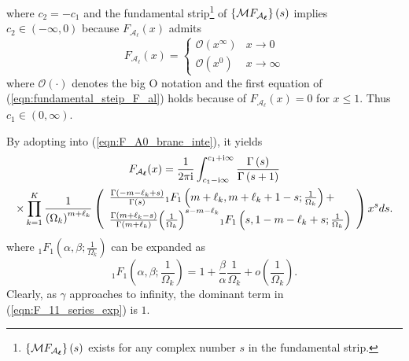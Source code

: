\documentclass[12pt,onecolumn,draftcls]{IEEEtran}
\newcommand{\bs}{\boldsymbol}
\begin{document}
where
$c_2 = -c_1$ and the fundamental strip\footnote{$ \left\{ {\mathcal M{{F_{{{ {\cal A}}_{\bs{\ell}}}}}}} \right\}\left( s \right)$ exists for any complex number $s$ in the fundamental strip.} of $ \left\{ {\mathcal M{{F_{{{ {\cal A}}_{\bs{\ell}}}}}}} \right\}\left( s \right)$ implies $c_2 \in (-\infty,0)$ because $ {F_{{\mathcal A_{\bs \ell} }}}\left( x \right)$ admits\cite[p400]{szpankowski2010average}
 \begin{equation}\label{eqn:fundamental_steip_F_al}
 {F_{{\mathcal A_{\bs \ell} }}}\left( x \right) = \left\{ {\begin{array}{*{20}{c}}
{\mathcal O\left( {{x^\infty }} \right)}&{x \to 0}\\
{\mathcal O\left( {{x^0}} \right)}&{x \to \infty }
\end{array}} \right.
 \end{equation}
 where $\mathcal O(\cdot)$ denotes the big O notation and the first equation of (\ref{eqn:fundamental_steip_F_al}) holds because of ${F_{{\mathcal A_{\bs \ell} }}}\left( x \right) = 0$ for $x \le 1$. Thus $c_1 \in (0,\infty)$.


By adopting \cite[Eq.9.210.2]{gradshteyn1965table} into (\ref{eqn:F_A0_brane_inte}), it yields
\begin{multline}\label{eqn:F_hat_A_0_der_fur_ex}
{F_{{{ {\cal A}}_{\bs{\ell}}}}}(x) = \frac{1}{{2\pi {\rm{i}}}}\int\nolimits_{c_1 - {\rm{i}}\infty }^{c_1 + {\rm{i}}\infty } {\frac{{\Gamma \left( s \right)}}{{\Gamma \left( {s + 1} \right)}} } \\
\times \prod\limits_{k = 1}^K {\frac{1}{{{{\left( {{\Omega _k}} \right)}^{m+\ell_k }}}}}\left( {\begin{array}{*{20}{l}}
{\frac{{\Gamma \left( { - m -\ell_k+ s} \right)}}{{\Gamma \left( s \right)}}{}_1{F_1}\left( {m+\ell_k ,m+\ell_k + 1 - s;\frac{1}{{{\Omega _k}}}} \right) + }\\
{\frac{{\Gamma \left( {m+\ell_k - s} \right)}}{{\Gamma \left( {m+\ell_k } \right)}}{{\left( {\frac{1}{{{\Omega _k}}}} \right)}^{s - m-\ell_k }}{}_1{F_1}\left( {s,1 - m-\ell_k + s;\frac{1}{{{\Omega _k}}}} \right)}
\end{array}} \right){x^s}ds.
\end{multline}
where ${}_1{F_1}\left( {\alpha ,\beta ;\frac{1}{{{\Omega _k}}}} \right)$ can be expanded as
\begin{equation}\label{eqn:F_11_series_exp}
{}_1{F_1}\left( {\alpha ,\beta ;\frac{1}{{{\Omega _k}}}} \right) = 1 + \frac{\beta }{\alpha }\frac{1}{{{\Omega _k}}} + o\left( {\frac{1}{{{\Omega _k}}}} \right).
\end{equation}
Clearly, as $\gamma$ approaches to infinity, the dominant term in (\ref{eqn:F_11_series_exp}) is $1$.
\end{document}
